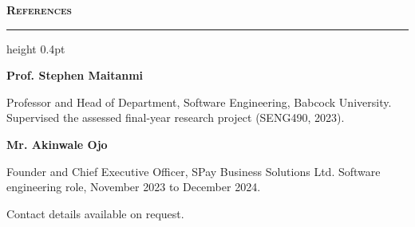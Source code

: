 \documentclass[10pt,a4paper]{article}
\newcommand{\cvsection}[1]{%
  \vspace{0.95em}%
  {\normalsize\bfseries\scshape #1}\par
  \vspace{0.25em}%
  \hrule height 0.4pt
  \vspace{0.6em}%
}
\newcommand{\cventry}[2]{%
  \textbf{#1}\hfill{\small #2}\par\vspace{0.15em}%
}
\begin{document}
%

\cvsection{References}

\cventry{Prof. Stephen Maitanmi}{}
{\small Professor and Head of Department, Software Engineering, Babcock
University. Supervised the assessed final-year research project (SENG490, 2023).}

\vspace{0.5em}

\cventry{Mr. Akinwale Ojo}{}
{\small Founder and Chief Executive Officer, SPay Business Solutions Ltd.
Software engineering role, November 2023 to December 2024.}

\vspace{0.5em}

{\small Contact details available on request.}

\end{document}
